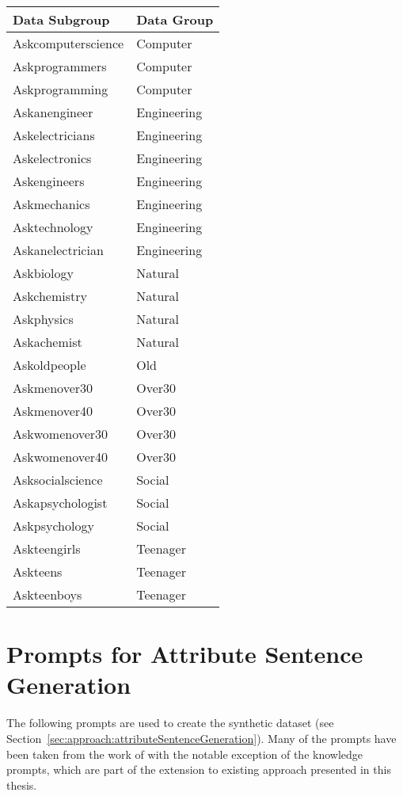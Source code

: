 \begin{tabular}{ll}
  \toprule
  {Data Subgroup}    & {Data Group} \\
  \midrule
  Askcomputerscience & Computer     \\
  Askprogrammers     & Computer     \\
  Askprogramming     & Computer     \\
  Askanengineer      & Engineering  \\
  Askelectricians    & Engineering  \\
  Askelectronics     & Engineering  \\
  Askengineers       & Engineering  \\
  Askmechanics       & Engineering  \\
  Asktechnology      & Engineering  \\
  Askanelectrician   & Engineering  \\
  Askbiology         & Natural      \\
  Askchemistry       & Natural      \\
  Askphysics         & Natural      \\
  Askachemist        & Natural      \\
  Askoldpeople       & Old          \\
  Askmenover30       & Over30       \\
  Askmenover40       & Over30       \\
  Askwomenover30     & Over30       \\
  Askwomenover40     & Over30       \\
  Asksocialscience   & Social       \\
  Askapsychologist   & Social       \\
  Askpsychology      & Social       \\
  Askteengirls       & Teenager     \\
  Askteens           & Teenager     \\
  Askteenboys        & Teenager     \\
  \bottomrule
\end{tabular}

\section{Prompts for Attribute Sentence Generation}
The following prompts are used to create the synthetic dataset (see Section~\ref{sec:approach:attributeSentenceGeneration}). Many of the prompts have been taken from the work of \citet{patelLearningInterpretableStyle2023} with the notable exception of the knowledge prompts, which are part of the extension to existing approach presented in this thesis.

